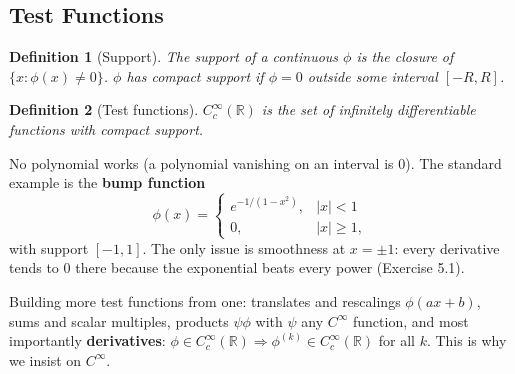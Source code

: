 \documentclass{article}
\newtheorem{definition}{Definition}
\newcommand{\R}{\mathbb{R}}
\newcommand{\D}{C_c^\infty(\R)}
\begin{document}
\subsection{Test Functions}
\begin{definition}[Support]
    The support of a continuous $\phi$ is the closure of $\{x : \phi(x) \neq 0\}$. $\phi$ has \emph{compact support} if $\phi = 0$ outside some interval $[-R,R]$.
\end{definition}
\begin{definition}[Test functions]
    $\D$ is the set of infinitely differentiable functions with compact support.
\end{definition}
No polynomial works (a polynomial vanishing on an interval is $0$). The standard example is the \textbf{bump function}
\begin{equation}
    \phi(x) = \begin{cases} e^{-1/(1-x^2)}, & |x| < 1 \\ 0, & |x| \geq 1, \end{cases}
\end{equation}
with support $[-1,1]$. The only issue is smoothness at $x = \pm 1$: every derivative tends to $0$ there because the exponential beats every power (Exercise 5.1).\par
Building more test functions from one: translates and rescalings $\phi(ax+b)$, sums and scalar multiples, products $\psi\phi$ with $\psi$ any $C^\infty$ function, and most importantly \textbf{derivatives}: $\phi \in \D \Rightarrow \phi^{(k)} \in \D$ for all $k$. This is why we insist on $C^\infty$.
\end{document}
